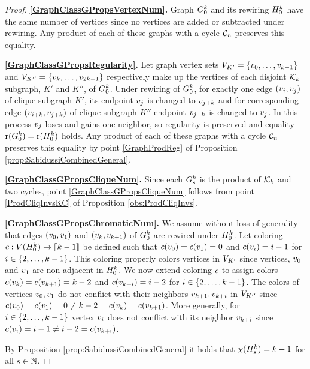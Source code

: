 \begin{proof}
     \textbf{\ref{GraphClassGPropsVertexNum}.}
     Graph $G_0^k$ and its rewiring $H_0^k$ have the same number of vertices since no vertices are added or subtracted under rewiring. Any product of each of these graphs with a cycle $\mathcal{C}_n$ preserves this equality.
    
    \textbf{\ref{GraphClassGPropsRegularity}.}
    Let graph vertex sets $V_{K'}=\{v_0, \ldots, v_{k-1}\}$ and $V_{K''}=\{v_k, \ldots, v_{2k-1}\}$ respectively make up the vertices of each disjoint $\mathcal{K}_k$ subgraph, $K'$ and $K''$, of $G_0^k$.
    Under rewiring of $G_0^k$, for exactly one edge $(v_i,v_j)$ of clique subgraph $K'$, its endpoint $v_j$ is changed to $v_{j+k}$ and for corresponding edge $(v_{i+k},v_{j+k})$ of clique subgraph $K''$ endpoint $v_{j+k}$ is changed to $v_{j}$. In this process $v_j$ loses and gains one neighbor, so regularity is preserved and equality $\mathrm{r}(G_0^k)=\mathrm{r}(H_0^k)$ holds. Any product of each of these graphs with a cycle $\mathcal{C}_n$ preserves this equality by point \ref{GraphProdReg} of Proposition \ref{prop:SabidussiCombinedGeneral}.
    
    \textbf{\ref{GraphClassGPropsCliqueNum}.} 
    Since each $G_s^k$ is the product of $\mathcal{K}_k$ and two cycles, point \ref{GraphClassGPropsCliqueNum} follows from point \ref{ProdCliqInvsKC} of Proposition \ref{obs:ProdCliqInvs}.

    \textbf{\ref{GraphClassGPropsChromaticNum}.}
    We assume without loss of generality that edges $(v_0, v_1)$ and $(v_k, v_{k+1})$ of $G_0^k$ are rewired under $H_0^k$. Let coloring $c: V(H_0^k) \rightarrow \llbracket k-1 \rrbracket$ be defined such that $c(v_0) = c(v_1) = 0$ and $c(v_i) = i-1$ for $i \in \{2, \ldots, k-1\}$. This coloring properly colors vertices in $V_{K'}$ since vertices, $v_0$ and $v_1$ are non adjacent in $H_0^k$. We now extend coloring $c$ to assign colors $c(v_{k}) = c(v_{k+1}) = k-2$ and $c(v_{k + i}) = i-2$ for $i \in \{2, \ldots, k-1\}$. The colors of vertices $v_0,v_1$ do not conflict with their neighbors $v_{k+1},v_{k + i}$ in $V_{K''}$ since $c(v_0) = c(v_1) = 0 \neq k-2 =c(v_{k}) = c(v_{k+1})$. More generally, for $i \in \{2, \ldots, k-1\}$ vertex $v_i$ does not conflict with its neighbor $v_{k+i}$ since $c(v_i) = i-1\neq i-2 = c(v_{k + i})$.

    By Proposition \ref{prop:SabidussiCombinedGeneral} it holds that $\chi(H_s^k) = k-1$ for all $s \in \mathbb{N}$.
\end{proof}

